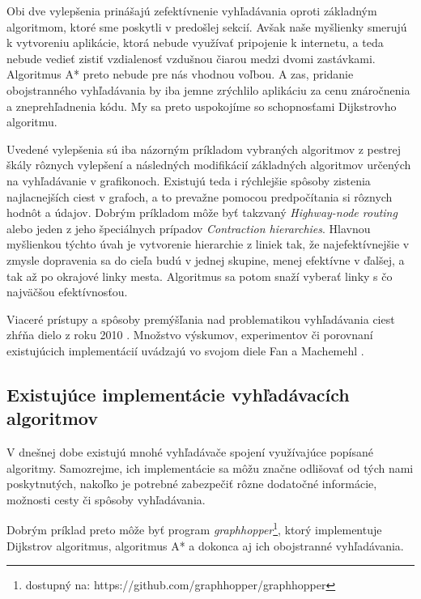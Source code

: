 Obi dve vylepšenia prinášajú zefektívnenie vyhľadávania oproti základným algoritmom, ktoré sme poskytli v predošlej sekcií. Avšak naše myšlienky smerujú k vytvoreniu aplikácie, ktorá nebude využívať pripojenie k internetu, a teda nebude vedieť zistiť vzdialenosť vzdušnou čiarou medzi dvomi zastávkami. Algoritmus A* preto nebude pre nás vhodnou voľbou. A zas, pridanie obojstranného vyhľadávania by iba jemne zrýchlilo aplikáciu za cenu znáročnenia a zneprehľadnenia kódu. My sa preto uspokojíme so schopnosťami Dijkstrovho algoritmu.\newline

Uvedené vylepšenia sú iba názorným príkladom vybraných algoritmov z pestrej škály rôznych vylepšení a následných modifikácií základných algoritmov určených na vyhľadávanie v grafikonoch. Existujú teda i rýchlejšie spôsoby zistenia najlacnejších ciest v grafoch, a to prevažne pomocou predpočítania si rôznych hodnôt a údajov. Dobrým príkladom môže byť takzvaný \textit{Highway-node routing}\cite{schultes2007dynamic} alebo jeden z jeho špeciálnych prípadov \textendash \textit{Contraction hierarchies}\cite{geisberger2008contraction}. Hlavnou myšlienkou týchto úvah je vytvorenie hierarchie z liniek tak, že najefektívnejšie v zmysle dopravenia sa do cieľa budú v jednej skupine, menej efektívne v ďalšej, a tak až po okrajové linky mesta. Algoritmus sa potom snaží vyberať linky s čo najväčšou efektívnosťou.\newline

Viaceré prístupy a spôsoby premýšľania nad problematikou vyhľadávania ciest zhŕňa dielo z roku 2010 \cite{bast2010fast}. Množstvo výskumov, experimentov či porovnaní existujúcich implementácií uvádzajú vo svojom diele Fan a Machemehl \cite{fan2004optimal}.


\subsection{Existujúce implementácie vyhľadávacích algoritmov}

V dnešnej dobe existujú mnohé vyhľadávače spojení využívajúce popísané algoritmy. Samozrejme, ich implementácie sa môžu značne odlišovať od tých nami poskytnutých, nakoľko je potrebné zabezpečiť rôzne dodatočné informácie, možnosti cesty či spôsoby vyhľadávania.\newline

Dobrým príklad preto môže byť program \textit{graphhopper}\footnote{dostupný na: https://github.com/graphhopper/graphhopper}, ktorý implementuje Dijkstrov algoritmus, algoritmus A* a dokonca aj ich obojstranné vyhľadávania.\newline

